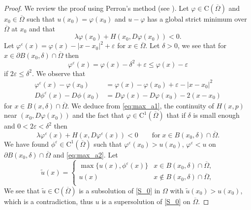\documentclass[11pt,reqno]{amsart}
\numberwithin{figure}{section}
\theoremstyle{plain}
\theoremstyle{remark}
\numberwithin{equation}{section}
\newcommand{\rmC}{\mathrm{C}}
\begin{document}
\begin{proof} We review the proof using Perron's method (see \cite{Capuzzo-Dolcetta1990}). Let $\varphi\in \rmC(\overline{\Omega})$ and $x_0\in \overline{\Omega}$ such that $u(x_0) = \varphi(x_0)$ and $u-\varphi$ has a global strict minimum over $\overline{\Omega}$ at $x_0$ and that 
\begin{equation}\label{eq:max_a1}
    \lambda \varphi(x_0) + H(x_0,D\varphi(x_0)) < 0.
\end{equation}
Let $\varphi^\varepsilon(x) = \varphi(x) - |x-x_0|^2 + \varepsilon$ for $x\in \overline{\Omega}$. Let $\delta > 0$, we see that for $x\in \partial B(x_0,\delta)\cap \overline{\Omega}$ then
\begin{equation*}
    \varphi^\varepsilon(x) = \varphi(x) - \delta^2 +\varepsilon \leq \varphi(x) - \varepsilon
\end{equation*}
if $2\varepsilon \leq \delta^2$. We observe that
\begin{equation*}
    \begin{split}
    \varphi^\varepsilon(x) - \varphi(x_0)  &= \varphi(x)-\varphi(x_0) + \varepsilon - |x-x_0|^2 \\
    D\phi^\varepsilon(x) - D\phi(x_0) &= D\varphi(x) - D\varphi(x_0) - 2(x-x_0)
    \end{split}
\end{equation*}
for $x\in B(x,\delta)\cap \overline{\Omega}$. We deduce from \eqref{eq:max_a1}, the continuity of $H(x,p)$ near $(x_0,D\varphi(x_0))$ and the fact that $\varphi\in \rmC^1(\overline{\Omega})$ that if $\delta$ is small enough and $0<2\varepsilon < \delta^2$ then
\begin{equation}\label{eq:max_a2}
    \lambda \varphi^\varepsilon(x)+H(x,D\varphi^\varepsilon(x)) < 0 \qquad\text{for}\;x\in B(x_0,\delta)\cap \overline{\Omega}.
\end{equation}
We have found $\phi^\varepsilon\in \mathrm{C}^1(\overline{\Omega})$ such that $\varphi^\varepsilon(x_0)>u(x_0)$, $\varphi^\varepsilon<u$ on $\partial B(x_0,\delta)\cap \overline{\Omega}$ and \eqref{eq:max_a2}. Let
\begin{equation*}
    \tilde{u}(x) = \begin{cases}
    \max \big\lbrace u(x),\phi^\varepsilon(x) \big\rbrace &x\in B(x_0,\delta)\cap \overline{\Omega},\\
    u(x)&x\notin B(x_0,\delta)\cap \overline{\Omega},\\
    \end{cases}
\end{equation*}
We see that $\tilde{u}\in \rmC(\overline{\Omega})$ is a subsolution of \eqref{S_0} in $\Omega$ with $\tilde{u}(x_0) > u(x_0)$, which is a contradiction, thus $u$ is a supersolution of \eqref{S_0} on $\overline{\Omega}$.
\end{proof}
\end{document}
